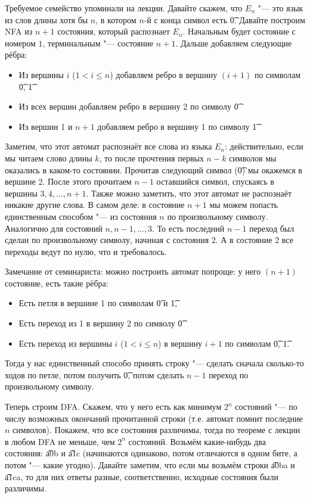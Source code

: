 	Требуемое семейство упоминали на лекции.
	Давайте скажем, что $E_n$ "--- это язык из слов длины хотя бы $n$,
	в котором $n$-й с конца символ есть \t{0}.
	Давайте построим NFA из $n+1$ состояния, который распознает $E_n$.
	Начальным будет состояние с номером $1$, терминальным "--- состояние $n+1$.
	Дальше добавляем следующие рёбра:
	\begin{itemize}
		\item Из вершины $i$ ($1 < i \le n$) добавляем ребро в вершину $(i+1)$ по символам \t{0}, \t{1}
		\item Из всех вершин добавляем ребро в вершину 2 по символу \t{0}
		\item Из вершин 1 и $n+1$ добавляем ребро в вершину 1 по символу \t{1}
	\end{itemize}
	Заметим, что этот автомат распознаёт все слова из языка $E_n$: действительно,
	если мы читаем слово длины $k$, то после прочтения первых $n-k$ символов мы оказались в каком-то состоянии.
	Прочитав следующий символ (\t{0}) мы окажемся в вершине 2.
	После этого прочитаем $n-1$ оставшийся символ, спускаясь в вершины $3, 4, \dots, n+1$.
	Также можно заметить, что этот автомат не распознаёт никакие другие слова.
	В самом деле: в состояние $n+1$ мы можем попасть единственным способом "--- из состояния $n$
	по произвольному символу.
	Аналогично для состояний $n, n-1, \dots, 3$.
	То есть последний $n-1$ переход был сделан по произвольному символу, начиная с состояния 2.
	А в состояние 2 все переходы ведут по нулю, что и требовалось.

	\begin{Rem}
		Замечание от семинариста: можно построить автомат попроще: у него $(n+1)$
		состояние, есть такие рёбра:
		\begin{itemize}
			\item Есть петля в вершине 1 по символам \t{0} и \t{1},
			\item Есть переход из 1 в вершину 2 по символу \t{0}
			\item Есть переход из вершины $i$ ($1 < i \le n$) в вершину $i+1$ по символам \t{0}, \t{1}.
		\end{itemize}
		Тогда у нас единственный способо принять строку "--- сделать сначала сколько-то ходов по петле,
		потом получить \t{0}, потом сделать $n-1$ переход по произвольному символу.
	\end{Rem}

	Теперь строим DFA.
	Скажем, что у него есть как минимум $2^n$ состояний "--- по числу возможных окончаний прочитанной строки
	(т.е. автомат помнит последние $n$ символов).
	Покажем, что все состояния различимы, тогда по теореме с лекции в любом DFA не меньше, чем $2^n$ состояний.
	Возьмём какие-нибудь два состояния: \t{a0b} и \t{a1c} (начинаются одинаково, потом отличаются в одном бите,
	а потом "--- какие угодно).
	Давайте заметим, что если мы возьмём строки \t{a0ba} и \t{a1ca}, то для них ответы разные,
	соответственно, исходные состояния были различимы.


